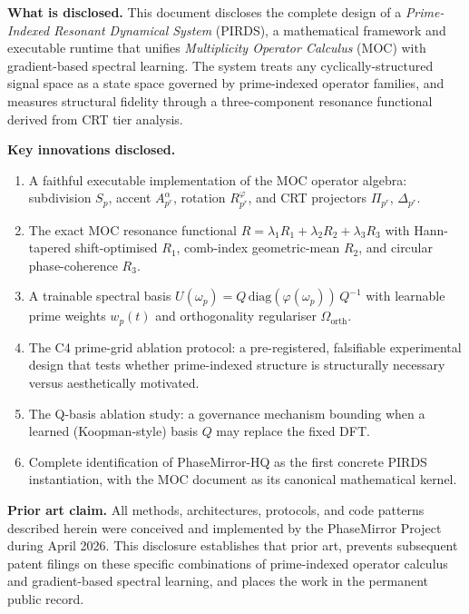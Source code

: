 \documentclass[11pt,a4paper]{article}
\theoremstyle{plain}
\theoremstyle{definition}
\theoremstyle{remark}
\begin{document}
\newpage
\begin{tcolorbox}[defbox, title={Executive Summary}]
\noindent\textbf{What is disclosed.}
This document discloses the complete design of a \emph{Prime-Indexed Resonant Dynamical System} (PIRDS), a mathematical framework and executable runtime that unifies \emph{Multiplicity Operator Calculus} (MOC) with gradient-based spectral learning. The system treats any cyclically-structured signal space as a state space governed by prime-indexed operator families, and measures structural fidelity through a three-component resonance functional derived from CRT tier analysis.

\vspace{0.5em}
\noindent\textbf{Key innovations disclosed.}
\begin{enumerate}[leftmargin=1.5em,itemsep=2pt]
  \item A faithful executable implementation of the MOC operator algebra: subdivision $S_p$, accent $A_{p^r}^\alpha$, rotation $R_{p^r}^\varphi$, and CRT projectors $\Pi_{p^r}$, $\Delta_{p^r}$.
  \item The exact MOC resonance functional $R = \lambda_1 R_1 + \lambda_2 R_2 + \lambda_3 R_3$ with Hann-tapered shift-optimised $R_1$, comb-index geometric-mean $R_2$, and circular phase-coherence $R_3$.
  \item A trainable spectral basis $U(\omega_p) = Q\,\mathrm{diag}(\varphi(\omega_p))\,Q^{-1}$ with learnable prime weights $w_p(t)$ and orthogonality regulariser $\Omega_{\mathrm{orth}}$.
  \item The C4 prime-grid ablation protocol: a pre-registered, falsifiable experimental design that tests whether prime-indexed structure is structurally necessary versus aesthetically motivated.
  \item The Q-basis ablation study: a governance mechanism bounding when a learned (Koopman-style) basis $Q$ may replace the fixed DFT.
  \item Complete identification of PhaseMirror-HQ as the first concrete PIRDS instantiation, with the MOC document as its canonical mathematical kernel.
\end{enumerate}

\vspace{0.5em}
\noindent\textbf{Prior art claim.}
All methods, architectures, protocols, and code patterns described herein were conceived and implemented by the PhaseMirror Project during April 2026. This disclosure establishes that prior art, prevents subsequent patent filings on these specific combinations of prime-indexed operator calculus and gradient-based spectral learning, and places the work in the permanent public record.
\end{tcolorbox}
\end{document}
